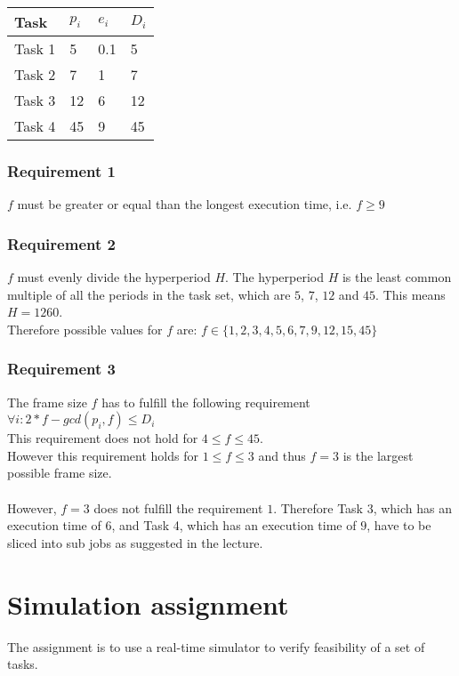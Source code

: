 \documentclass{article}
\begin{document}
\begin{tabular}{|l||l|l|l|}
\hline
Task   & $p_i$ & $e_i$ & $D_i$ \\
\hline
\hline
Task 1 & 5 & 0.1 & 5 \\
\hline
Task 2 & 7 & 1 & 7 \\
\hline
Task 3 & 12 & 6 & 12 \\
\hline
Task 4 & 45 & 9 & 45 \\
\hline
\end{tabular}

\subsubsection{Requirement 1}
$f$ must be greater or equal than the longest execution time, i.e. $f \geq 9$

\subsubsection{Requirement 2}
$f$ must evenly divide the hyperperiod $H$. The hyperperiod $H$ is the least common multiple of
all the periods in the task set, which are $5$, $7$, $12$ and $45$. This means $H = 1260$. \\
Therefore possible values for $f$ are: $f \in \{1, 2, 3, 4, 5, 6, 7, 9, 12, 15, 45\}$

\subsubsection{Requirement 3}
The frame size $f$ has to fulfill the following requirement $\forall i: 2*f-gcd(p_i,f) \leq D_i$ \\
This requirement does not hold for $4 \leq f \leq 45$. \\
However this requirement holds for $1 \leq f \leq 3$ and thus $f = 3$ is the
largest possible frame size. \\
\\
However, $f = 3$ does not fulfill the requirement $1$.
Therefore Task 3, which has an execution time of $6$, and Task 4, which has an execution time of $9$,
have to be sliced into sub jobs as suggested in the lecture.

\section{Simulation assignment}

The assignment is to use a real-time simulator to verify feasibility of a set of tasks.
\end{document}
